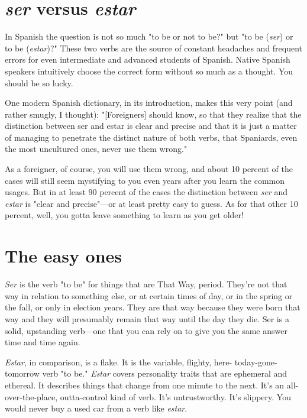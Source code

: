 \documentclass[14pt,a4paper,oneside]{memoir}
\begin{document}
\section{\emph{ser} versus \emph{estar}}

In Spanish the question is not so much "to be or not to be?"
but "to be (\emph{ser}) or to be (\emph{estar})?" These two verbs are the source of
constant headaches and frequent errors for even intermediate and
advanced students of Spanish. Native Spanish speakers intuitively
choose the correct form without so much as a thought. You should
be so lucky.

One modern Spanish dictionary, in its introduction, makes
this very point (and rather smugly, I thought): "[Foreigners] should
know, so that they realize that the distinction between ser and estar is
clear and precise and that it is just a matter of managing to penetrate
the distinct nature of both verbs, that Spaniards, even the most uncultured ones, never use them wrong."

As a foreigner, of course, you will use them wrong, and about
10 percent of the cases will still seem mystifying to you even years
after you learn the common usages. But in at least 90 percent of the
cases the distinction between \emph{ser} and \emph{estar} is "clear and precise"---or
at least pretty easy to guess. As for that other 10 percent, well, you
gotta leave something to learn as you get older!

\section{The easy ones}

\emph{Ser} is the verb "to be" for things that are That Way, period.
They're not that way in relation to something else, or at certain times
of day, or in the spring or the fall, or only in election years. They are
that way because they were born that way and they will presumably
remain that way until the day they die. Ser is a solid, upstanding
verb---one that you can rely on to give you the same answer time
and time again.

\emph{Estar}, in comparison, is a flake. It is the variable, flighty, here-
today-gone-tomorrow verb "to be." \emph{Estar} covers personality traits that
are ephemeral and ethereal. It describes things that change from one
minute to the next. It's an all-over-the-place, outta-control kind of
verb. It's untrustworthy. It's slippery. You would never buy a used car
from a verb like \emph{estar}.
\end{document}
